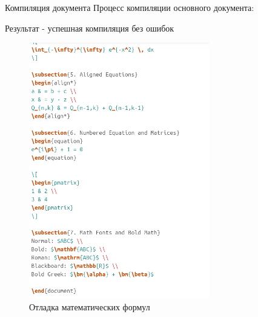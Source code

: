 \begin{frame}[fragile]{Компиляция документа}
\label{ux43aux43eux43cux43fux438ux43bux44fux446ux438ux44f-ux434ux43eux43aux443ux43cux435ux43dux442ux430}
Процесс компиляции основного документа:

\begin{Shaded}
\begin{Highlighting}[]
\end{Highlighting}
\end{Shaded}

Результат - успешная компиляция без ошибок

\begin{figure}
\centering
\includegraphics[width=0.7\textwidth,height=\textheight]{image_03.jpg}
\caption{Отладка математических формул}
\end{figure}
\end{frame}

